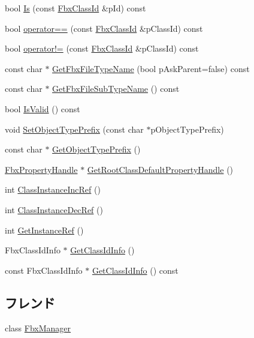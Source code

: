 \begin{DoxyCompactItemize}
\item 
bool \hyperlink{class_fbx_class_id_a276315faecc3a540664b49f6ba73b542}{Is} (const \hyperlink{class_fbx_class_id}{Fbx\+Class\+Id} \&p\+Id) const
\item 
bool \hyperlink{class_fbx_class_id_af52cd2e39251da6e43f5a5ce87151984}{operator==} (const \hyperlink{class_fbx_class_id}{Fbx\+Class\+Id} \&p\+Class\+Id) const
\item 
bool \hyperlink{class_fbx_class_id_a2743b7231681c0fbb92926842135e853}{operator!=} (const \hyperlink{class_fbx_class_id}{Fbx\+Class\+Id} \&p\+Class\+Id) const
\item 
const char $\ast$ \hyperlink{class_fbx_class_id_ac1cca09d096f3f65f6df0f03d4ce7e39}{Get\+Fbx\+File\+Type\+Name} (bool p\+Ask\+Parent=false) const
\item 
const char $\ast$ \hyperlink{class_fbx_class_id_a2aa9a15c83252c28a9ffd01366e9348b}{Get\+Fbx\+File\+Sub\+Type\+Name} () const
\item 
bool \hyperlink{class_fbx_class_id_a7ef887641b41040beea323813806046c}{Is\+Valid} () const
\item 
void \hyperlink{class_fbx_class_id_aa62f8547a3ed3a2c3c7f1ea88b392d8c}{Set\+Object\+Type\+Prefix} (const char $\ast$p\+Object\+Type\+Prefix)
\item 
const char $\ast$ \hyperlink{class_fbx_class_id_a31ab0fd2220388a26bbc10b0ed7aef67}{Get\+Object\+Type\+Prefix} ()
\item 
\hyperlink{class_fbx_property_handle}{Fbx\+Property\+Handle} $\ast$ \hyperlink{class_fbx_class_id_a7dc7dd00c35e2bcaa97b5296973dda44}{Get\+Root\+Class\+Default\+Property\+Handle} ()
\item 
int \hyperlink{class_fbx_class_id_a7133ed002b3dc51f227f05f178f4d9c9}{Class\+Instance\+Inc\+Ref} ()
\item 
int \hyperlink{class_fbx_class_id_a2e3e27c3ac450640cc232e1bae749ae7}{Class\+Instance\+Dec\+Ref} ()
\item 
int \hyperlink{class_fbx_class_id_a8650ac5fe79b1241e0c65b32d67d1fcc}{Get\+Instance\+Ref} ()
\item 
Fbx\+Class\+Id\+Info $\ast$ \hyperlink{class_fbx_class_id_a71fa5e648cb7a7949fa13e30b94e05e6}{Get\+Class\+Id\+Info} ()
\item 
const Fbx\+Class\+Id\+Info $\ast$ \hyperlink{class_fbx_class_id_ab773eed6b02a90514547cff07b1a7e24}{Get\+Class\+Id\+Info} () const
\end{DoxyCompactItemize}
\subsection*{フレンド}
\begin{DoxyCompactItemize}
\item 
class \hyperlink{class_fbx_class_id_aa6292f0d09535e3fe957088d09276268}{Fbx\+Manager}
\end{DoxyCompactItemize}


